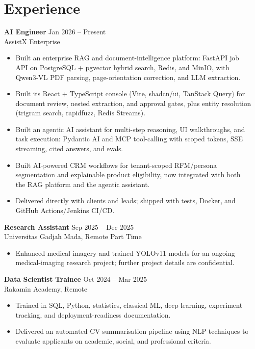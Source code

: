 \documentclass[10pt,a4paper]{article}
\begin{document}
\section*{Experience}
\textbf{AI Engineer} \hfill Jan 2026 -- Present\\
AssistX Enterprise
\begin{itemize}
  \item Built an enterprise RAG and document-intelligence platform: FastAPI job API on PostgreSQL + pgvector hybrid search, Redis, and MinIO, with Qwen3-VL PDF parsing, page-orientation correction, and LLM extraction.
  \item Built its React + TypeScript console (Vite, shadcn/ui, TanStack Query) for document review, nested extraction, and approval gates, plus entity resolution (trigram search, rapidfuzz, Redis Streams).
  \item Built an agentic AI assistant for multi-step reasoning, UI walkthroughs, and task execution: Pydantic AI and MCP tool-calling with scoped tokens, SSE streaming, cited answers, and evals.
  \item Built AI-powered CRM workflows for tenant-scoped RFM/persona segmentation and explainable product eligibility, now integrated with both the RAG platform and the agentic assistant.
  \item Delivered directly with clients and leads; shipped with tests, Docker, and GitHub Actions/Jenkins CI/CD.
\end{itemize}

\textbf{Research Assistant} \hfill Sep 2025 -- Dec 2025\\
Universitas Gadjah Mada, Remote Part Time
\begin{itemize}
  \item Enhanced medical imagery and trained YOLOv11 models for an ongoing medical-imaging research project; further project details are confidential.
\end{itemize}

\textbf{Data Scientist Trainee} \hfill Oct 2024 -- Mar 2025\\
Rakamin Academy, Remote
\begin{itemize}
  \item Trained in SQL, Python, statistics, classical ML, deep learning, experiment tracking, and deployment-readiness documentation.
  \item Delivered an automated CV summarisation pipeline using NLP techniques to evaluate applicants on academic, social, and professional criteria.
\end{itemize}
\end{document}
